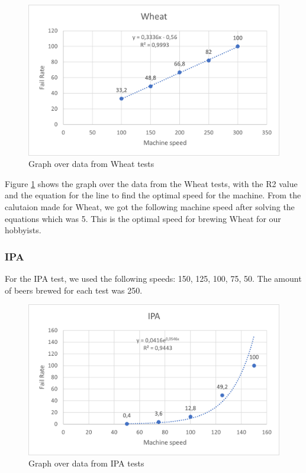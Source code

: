 \begin{center}
    \centering
    \begin{figure}[H]
        \includegraphics[width=1\textwidth]{img/Wheat_graph.png}
        \caption{Graph over data from Wheat tests}
        \label{fig:Wheat_graph}
    \end{figure}
\end{center}

Figure \ref{fig:Wheat_graph} shows the graph over the data from the Wheat tests, with the R2 value and the equation for the line to find the optimal speed for the machine. \newline
From the calutaion made for Wheat, we got the following machine speed after solving the equations which was 5. This is the optimal speed for brewing Wheat for our hobbyists. \newline

\subsubsection{IPA}
For the IPA test, we used the following speeds: 150, 125, 100, 75, 50. The amount of beers brewed for each test was 250.

\begin{center}
    \centering
    \begin{figure}[H]
        \includegraphics[width=1\textwidth]{img/IPA_graph.png}
        \caption{Graph over data from IPA tests}
        \label{fig:IPA_graph}
    \end{figure}
\end{center}

